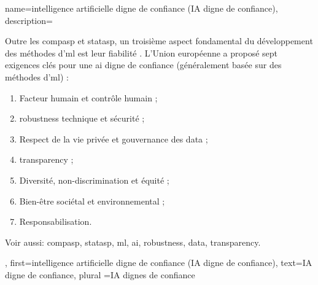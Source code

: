 {
	name={intelligence artificielle digne de confiance (IA digne de confiance)},
	description={Outre les \gls{compasp} et \gls{statasp}, un troisième aspect fondamental 
		du développement des méthodes d'\gls{ml} est leur fiabilité 
		\cite{pfau2024engineeringtrustworthyaideveloper}. 
		L’Union européenne a proposé sept exigences clés pour une \gls{ai} digne de confiance 
		(généralement basée sur des méthodes d'\gls{ml}) \cite{ALTAIEU}: 
		\begin{enumerate}[label=\arabic*)]
			\item Facteur humain et contrôle humain ;
			\item \Gls{robustness} technique et sécurité ;
			\item Respect de la vie privée et gouvernance des \gls{data} ;
			\item \Gls{transparency} ;
			\item Diversité, non-discrimination et équité ;
			\item Bien-être sociétal et environnemental ;
			\item Responsabilisation. 
		\end{enumerate}
	Voir aussi: \gls{compasp}, \gls{statasp}, \gls{ml}, \gls{ai}, \gls{robustness}, \gls{data}, \gls{transparency}.
	},
	first={intelligence artificielle digne de confiance (IA digne de confiance)},
	text={IA digne de confiance}, plural ={IA dignes de confiance}
}

